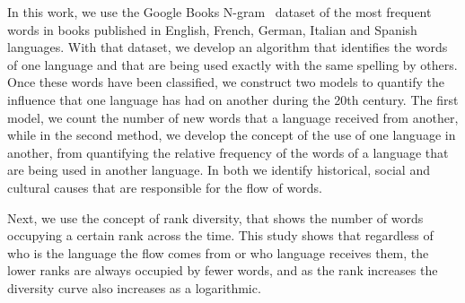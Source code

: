 \documentclass[10pt,letterpaper]{article} %
\begin{document}
In this work, we use the Google Books N-gram~\cite{ngramv} dataset of the most
frequent words in books published in  English, French, German, Italian and
Spanish languages.  With that dataset,  we develop an algorithm that identifies
the words of one language  and that are being used exactly with the same 
spelling by others. Once these words
have been classified, we construct two models to quantify  the influence that
one language has had on another during the 20th century. The first model, we
count the number of new words that a language received from another, while in
the second method, we develop the concept of the use of one language in
another,  from quantifying the relative frequency of  the words of a language
that are being used in another language. In both we identify historical, social
and cultural causes that are responsible for the flow of words.

Next, we use the concept of rank diversity,  that shows the number of words
occupying a certain rank across the time. This study shows that  regardless of
who is the language the flow comes from or who language receives them,  the
lower ranks are always occupied by fewer  words, and as the rank increases the
diversity curve also increases as a logarithmic. 



\end{document}
